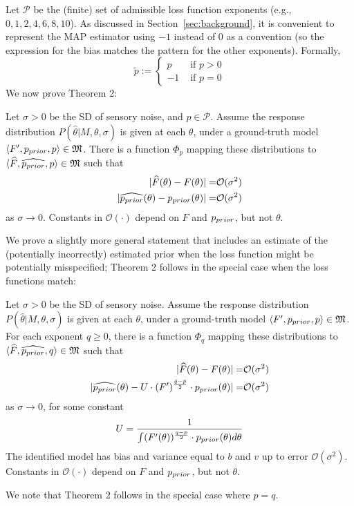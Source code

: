 Let $\mathcal{P}$ be the (finite) set of admissible loss function exponents (e.g., $0, 1, 2, 4, 6, 8, 10$).
As discussed in Section~\ref{sec:background}, it is convenient to represent the MAP estimator using $-1$ instead of $0$ as a convention (so the expression for the bias matches the pattern for the other exponents). Formally,
\begin{equation}\label{eq:tilde-p}
    \tilde{p} := \begin{cases} p &\text{ if } p > 0 \\ -1 & \text{ if } p=0\end{cases}
\end{equation}
We now prove Theorem 2:
\begin{thm}\label{thm:identifiability-well-specified}
Let $\sigma > 0$ be the SD of sensory noise, and $p \in \mathcal{P}$.
Assume the %
response distribution $P(\widehat{\theta}|M,\theta, \sigma)$ is given at each $\theta$, under a ground-truth model $\langle F', p_{prior},p \rangle \in \mathfrak{M}$. 
There is a function $\Phi_p$ mapping these distributions to $\langle \widehat{F}, \widehat{p_{prior}},p \rangle \in \mathfrak{M}$ such that 
\begin{align*}
|\widehat{F}(\theta) - F(\theta)| =& \mathcal{O}(\sigma^2) \\
|\widehat{p_{prior}}(\theta) - p_{prior}(\theta) | =& \mathcal{O}(\sigma^2) 
\end{align*}
as $\sigma \rightarrow 0$.
Constants in $\mathcal{O}(\cdot)$ depend on $F$ and $p_{prior}$, but not  $\theta$. 
\end{thm}
We prove a slightly more general statement that includes an estimate of the (potentially incorrectly) estimated prior when the loss function might be potentially misspecified; Theorem 2 follows in the special case when the loss functions match: 
\begin{thm}\label{thm:identifiability}
Let $\sigma > 0$ be the SD of sensory noise.
Assume the 
response distribution $P(\widehat{\theta}|M,\theta, \sigma)$ is given at each $\theta$, under a ground-truth model $\langle F', p_{prior},p \rangle \in \mathfrak{M}$. 
For each exponent $q \geq 0$, there is a function $\Phi_q$ mapping these distributions to $\langle \widehat{F}, \widehat{p_{prior}},q \rangle \in \mathfrak{M}$ such that 
\begin{align*}
|\widehat{F}(\theta) - F(\theta)| =& \mathcal{O}(\sigma^2) \\
|\widehat{p_{prior}}(\theta) - U \cdot (F')^{\frac{\tilde{q}-\tilde{p}}{2}} \cdot p_{prior}(\theta) | =& \mathcal{O}(\sigma^2) 
\end{align*}
as $\sigma \rightarrow 0$, for some constant
\begin{equation}
    U = \frac{1}{\int (F'(\theta))^{\frac{q-p}{2}} \cdot p_{prior}(\theta) d\theta }
\end{equation}
The identified model has bias and variance equal to $b$ and $v$ up to error $\mathcal{O}(\sigma^2)$.
Constants in $\mathcal{O}(\cdot)$ depend on $F$ and $p_{prior}$, but not  $\theta$. 
\end{thm}
We note that Theorem 2 follows in the special case where $p=q$.


